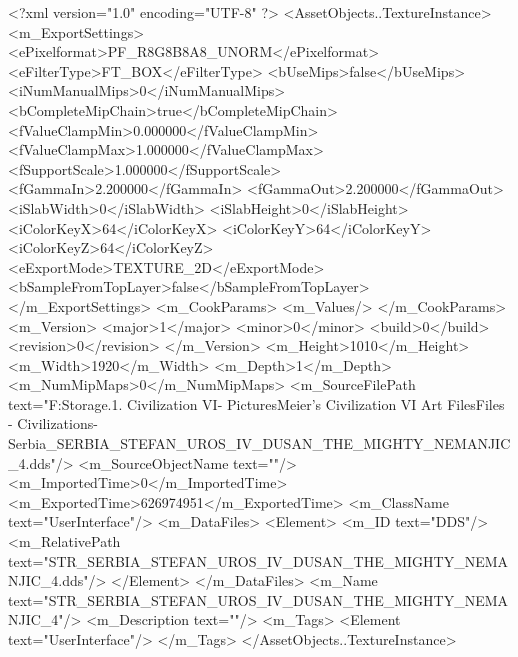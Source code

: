 <?xml version="1.0" encoding="UTF-8" ?>
<AssetObjects..TextureInstance>
	<m_ExportSettings>
		<ePixelformat>PF_R8G8B8A8_UNORM</ePixelformat>
		<eFilterType>FT_BOX</eFilterType>
		<bUseMips>false</bUseMips>
		<iNumManualMips>0</iNumManualMips>
		<bCompleteMipChain>true</bCompleteMipChain>
		<fValueClampMin>0.000000</fValueClampMin>
		<fValueClampMax>1.000000</fValueClampMax>
		<fSupportScale>1.000000</fSupportScale>
		<fGammaIn>2.200000</fGammaIn>
		<fGammaOut>2.200000</fGammaOut>
		<iSlabWidth>0</iSlabWidth>
		<iSlabHeight>0</iSlabHeight>
		<iColorKeyX>64</iColorKeyX>
		<iColorKeyY>64</iColorKeyY>
		<iColorKeyZ>64</iColorKeyZ>
		<eExportMode>TEXTURE_2D</eExportMode>
		<bSampleFromTopLayer>false</bSampleFromTopLayer>
	</m_ExportSettings>
	<m_CookParams>
		<m_Values/>
	</m_CookParams>
	<m_Version>
		<major>1</major>
		<minor>0</minor>
		<build>0</build>
		<revision>0</revision>
	</m_Version>
	<m_Height>1010</m_Height>
	<m_Width>1920</m_Width>
	<m_Depth>1</m_Depth>
	<m_NumMipMaps>0</m_NumMipMaps>
	<m_SourceFilePath text="F:\Mod Storage\2.1. Civilization VI\Mods\Archive - Pictures\Sid Meier's Civilization VI Art Files\Art Files - Civilizations\Civilization - Serbia\STR_SERBIA_STEFAN_UROS_IV_DUSAN_THE_MIGHTY_NEMANJIC_4.dds"/>
	<m_SourceObjectName text=""/>
	<m_ImportedTime>0</m_ImportedTime>
	<m_ExportedTime>626974951</m_ExportedTime>
	<m_ClassName text="UserInterface"/>
	<m_DataFiles>
		<Element>
			<m_ID text="DDS"/>
			<m_RelativePath text="STR_SERBIA_STEFAN_UROS_IV_DUSAN_THE_MIGHTY_NEMANJIC_4.dds"/>
		</Element>
	</m_DataFiles>
	<m_Name text="STR_SERBIA_STEFAN_UROS_IV_DUSAN_THE_MIGHTY_NEMANJIC_4"/>
	<m_Description text=""/>
	<m_Tags>
		<Element text="UserInterface"/>
	</m_Tags>
</AssetObjects..TextureInstance>

